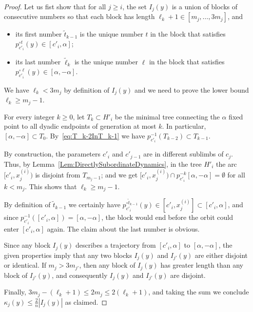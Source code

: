 \documentclass[12pt]{amsart}
\newcommand{\0}{\texttt{0}}
\newcommand{\1}{\texttt{1}}
\theoremstyle{definition}
\numberwithin{equation}{section}
\begin{document}
\begin{proof}
Let us fist show that for all $j\ge i$, the set $I_j(y)$ is a union of blocks of consecutive numbers so that each block has length $\ell_k+1\in[m_j,\dots, 3m_j]$, and 
\begin{itemize}
\item
 its first number $ \tilde t_{k-1}$ is the unique number $t$ in the block that satisfies $p_{c'_i}^{\circ t}(y)\in [c'_i, \alpha]$;  %
\item
its last number $\tilde\ell_k$ is the unique number $\ell$ in the block that satisfies 
$p_{c'_i}^{\circ \ell}(y)\in [\alpha,-\alpha]$.
\end{itemize}
We have $\ell_k<3m_j$ by definition of $I_j(y)$ and we need to prove the lower bound $\ell_k\ge m_j -1$.


For every integer $k\ge 0$, let $T_k\subset H'_i$ be the minimal tree connecting the $\alpha$ fixed point to all dyadic endpoints of generation at most $k$. In particular, $[\alpha,-\alpha]\subset T_0$. By~\eqref{eq:T_k-2InT_k-1} we have $p_{c'_i}^{-1}(T_{k-2})\subset T_{k-1}$. 

By construction, the parameters $c'_i$ and $c'_{j-1}$ are in different sublimbs of $c_{j}$. Thus, by Lemma~\ref{Lem:DirectlySubordinateDynamics}, in the tree $H'_i$ the arc $[c'_i,x_{j}^{(i)})$ is disjoint from $T_{m_j-1 }$; and we get $[c'_i,x_{j}^{(i)})\cap p_{c'_i}^{-k} [\alpha,-\alpha]=\emptyset$ for all $k< m_j$. This shows that $\ell_k\ge m_j -1$. 

By definition of $ \tilde t_{k-1}$ we certainly have $p_{c'_i}^{\circ \tilde t_{k-1}}(y)\in[c'_i,x^{(i)}_j]\subset [c'_i,\alpha]$, and since $p_{c'_i}^{-1}([c'_i,\alpha])=[\alpha,-\alpha]$, the block would end before the orbit could enter $[c'_i,\alpha]$
again. The claim about the last number is obvious.

Since any block $I_j(y)$ describes a trajectory from $[c'_i,\alpha]$ to $[\alpha,-\alpha]$, the given properties imply that any two blocks $I_j(y)$ and $I_{j'}(y)$ are either disjoint or identical. If $m_j > 3 m_{j'}$, then any block of $I_j(y)$ has greater length than any block of $I_{j'}(y)$, and consequently $I_{j}(y)$ and $I_{j'}(y)$ are disjoint. 

Finally, $3m_j-(\ell_k+1) \le 2m_j \le 2(\ell_k+1)$, and taking the sum we conclude $\kappa_j(y) \le  \frac 2 n |I_j(y)|$ as claimed.
\end{proof}


\end{document}
